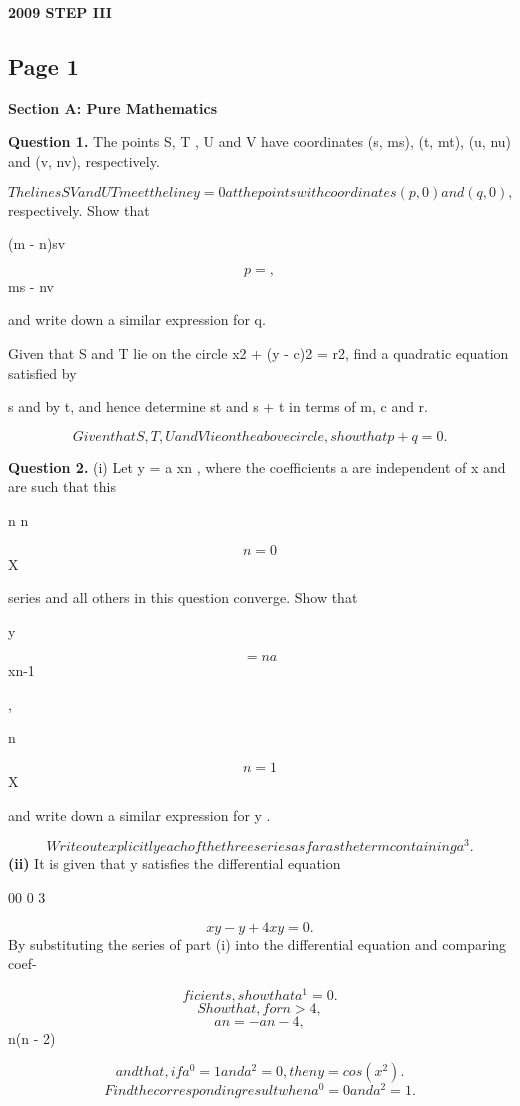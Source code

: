 \documentclass[12pt]{article}
\begin{document}
\begin{center}
{\Large \textbf{2009 STEP III}}
\end{center}

\subsection*{Page 1}
\begin{flushleft}
\bigskip\textbf{Section A: Pure Mathematics}\par
\bigskip\textbf{Question 1.} The points S, T , U and V have coordinates (s, ms), (t, mt), (u, nu) and (v, nv), respectively.\par
\[The lines SV and U T meet the line y = 0 at the points with coordinates (p, 0) and (q, 0),\]
respectively. Show that\par
(m - n)sv\par
\[p = ,\]
ms - nv\par
and write down a similar expression for q.\par
Given that S and T lie on the circle x2 + (y - c)2 = r2, find a quadratic equation satisfied by\par
s and by t, and hence determine st and s + t in terms of m, c and r.\par
\[Given that S, T , U and V lie on the above circle, show that p + q = 0.\]
\infty\par
\bigskip\textbf{Question 2.} (i) Let y = a xn , where the coefficients a are independent of x and are such that this\par
n n\par
\[n=0\]
X\par
series and all others in this question converge. Show that\par
\infty\par
y\par
\[= na\]
xn-1\par
,\par
n\par
\[n=1\]
X\par
and write down a similar expression for y .\par
\[Write out explicitly each of the three series as far as the term containing a^3.\]
\textbf{(ii)} It is given that y satisfies the differential equation\par
00 0 3\par
\[xy - y + 4x y = 0 .\]
By substituting the series of part (i) into the differential equation and comparing coef-\par
\[ficients, show that a^1 = 0.\]
\[Show that, for n > 4,\]
\[a n = - a n-4 ,\]
n(n - 2)\par
\[and that, if a^0 = 1 and a^2 = 0, then y = cos(x^2) .\]
\[Find the corresponding result when a^0 = 0 and a^2 = 1.\]
\end{flushleft}
\end{document}
